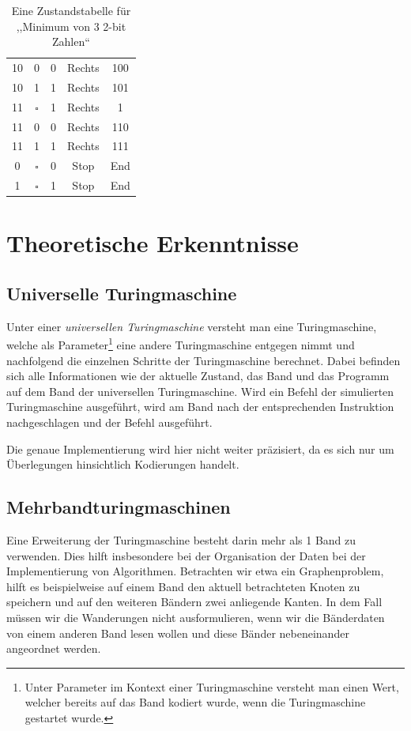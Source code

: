 \begin{table}
\begin{center}
\begin{tabular}{ccccc}
    10      & 0         & 0         & Rechts   & 100 \\
    10      & 1         & 1         & Rechts   & 101 \\
    11      & $\square$ & 1         & Rechts   & 1 \\
    11      & 0         & 0         & Rechts   & 110 \\
    11      & 1         & 1         & Rechts   & 111 \\
    0       & $\square$ & 0         & Stop     & End \\
    1       & $\square$ & 1         & Stop     & End \\
   \hline
  \end{tabular}
  \caption{Eine Zustandstabelle für ,,Minimum von 3 2-bit Zahlen``}
  \label{tab:count_ones}
 \end{center}
\end{table}

\section{Theoretische Erkenntnisse}
\subsection{Universelle Turingmaschine}
%
Unter einer \emph{universellen Turingmaschine} versteht man eine Turingmaschine, welche als Parameter\footnote{Unter Parameter im Kontext einer Turingmaschine versteht man einen Wert, welcher bereits auf das Band kodiert wurde, wenn die Turingmaschine gestartet wurde.} eine andere Turingmaschine entgegen nimmt und nachfolgend die einzelnen Schritte der Turingmaschine berechnet. Dabei befinden sich alle Informationen wie der aktuelle Zustand, das Band und das Programm auf dem Band der universellen Turingmaschine. Wird ein Befehl der simulierten Turingmaschine ausgeführt, wird am Band nach der entsprechenden Instruktion nachgeschlagen und der Befehl ausgeführt.

Die genaue Implementierung wird hier nicht weiter präzisiert, da es sich nur um Überlegungen hinsichtlich Kodierungen handelt.
%
\subsection{Mehrbandturingmaschinen}
%
Eine Erweiterung der Turingmaschine besteht darin mehr als 1 Band zu verwenden. Dies hilft insbesondere bei der Organisation der Daten bei der Implementierung von Algorithmen. Betrachten wir etwa ein Graphenproblem, hilft es beispielweise auf einem Band den aktuell betrachteten Knoten zu speichern und auf den weiteren Bändern zwei anliegende Kanten. In dem Fall müssen wir die Wanderungen nicht ausformulieren, wenn wir die Bänderdaten von einem anderen Band lesen wollen und diese Bänder nebeneinander angeordnet werden.

